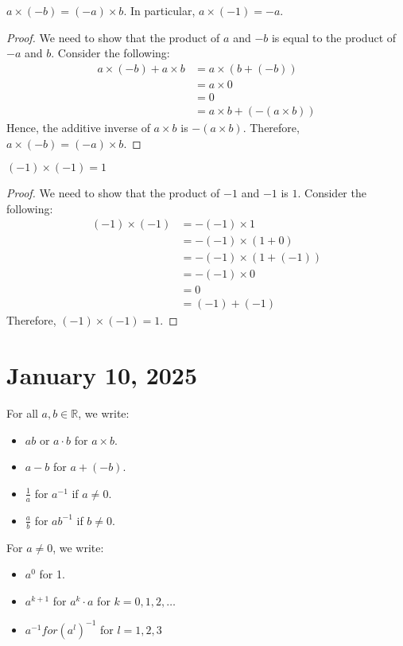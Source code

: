 \documentclass[11pt]{article}
\begin{document}
\begin{proposition}
	$a \times (-b) = (-a) \times b$. In particular, $a \times (-1) = -a$.
\end{proposition}

\begin{proof}
	We need to show that the product of $a$ and $-b$ is equal to the product of $-a$ and $b$. Consider the following:
	\begin{align*}
		a \times (-b) + a \times b & = a \times (b + (-b))          \\
		                           & = a \times 0                   \\
		                           & = 0                            \\
		                           & = a \times b + (-(a \times b))
	\end{align*}
	Hence, the additive inverse of $a \times b$ is $-(a \times b)$. Therefore, $a \times (-b) = (-a) \times b$.
\end{proof}

\begin{proposition}
	$(-1) \times (-1) = 1$
\end{proposition}

\begin{proof}
	We need to show that the product of $-1$ and $-1$ is $1$. Consider the following:
	\begin{align*}
		(-1) \times (-1) & = -(-1) \times 1          \\
		                 & = -(-1) \times (1 + 0)    \\
		                 & = -(-1) \times (1 + (-1)) \\
		                 & = -(-1) \times 0          \\
		                 & = 0                       \\
		                 & = (-1) + (-1)
	\end{align*}
	Therefore, $(-1) \times (-1) = 1$.
\end{proof}

\section{January 10, 2025}

For all \(a, b \in \mathbb{R}\), we write:
\begin{itemize}
	\item \(ab\) or \(a \cdot b\) for \(a \times b\).
	\item \(a - b\) for \(a + (-b)\).
	\item \(\frac{1}{a}\) for \(a^{-1}\) if \(a \neq 0\).
	\item \(\frac{a}{b}\) for \(a b^{-1}\) if \(b \neq 0\).
\end{itemize}
For \(a \neq 0\), we write:
\begin{itemize}
	\item \(a^0\) for 1.
	\item \(a^{k + 1}\) for \(a^k \cdot a\) for \(k = 0, 1, 2, \ldots\)
	\item \(a^{-1} for (a^l)^{-1}\) for \(l = 1, 2, 3\)
\end{itemize}
\end{document}
